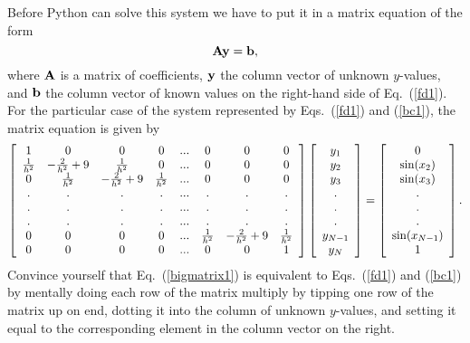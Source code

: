 Before Python can solve this system we have to put it in a matrix
equation of the form 
\begin{equation}
    {\bf A y} = {\bf b},
\end{equation}
where ${\bf A}$ is a matrix of coefficients, ${\bf y}$ the column
vector of unknown $y$-values, and ${\bf b}$ the column vector of
known values on the right-hand side of Eq.~(\ref{fd1}).  For the
particular case of the system represented by Eqs.~(\ref{fd1}) and
(\ref{bc1}), the matrix equation is given by \small
\begin{equation}\label{bigmatrix1}
\left[
\begin{array}{cccccccc}
1 & 0 & 0 & 0 & ... & 0 & 0 & 0 \\
{1 \over h^2} & -{2 \over h^2} + 9 & {1 \over h^2} & 0 & ... & 0 & 0 & 0 \\
0 & {1 \over h^2} & -{2 \over h^2} + 9 & {1 \over h^2} & ... & 0 & 0 & 0 \\
. & . & . & . & ... & . & . & . \\
. & . & . & . & ... & . & . & . \\
. & . & . & . & ... & . & . & . \\
0 & 0 & 0 & 0 & ... & {1 \over h^2} & -{2 \over h^2} + 9 & {1 \over h^2} \\
0 & 0 & 0 & 0 & ... & 0 & 0 & 1 \\
\end{array}
\right]
\left[
\begin{array}{c}
y_1 \\
y_2 \\
y_3  \\
.   \\
.   \\
.   \\
y_{N-1}  \\
y_N
\end{array}
\right]
=
\left[
\begin{array}{c}
0   \\
\sin (x_2) \\
\sin ( x_3) \\
.  \\
.  \\
.  \\
\sin( x_{N-1} )\\
1
\end{array}
\right] .
\end{equation} \normalsize
Convince yourself that Eq.~(\ref{bigmatrix1}) is equivalent to
Eqs.~(\ref{fd1}) and (\ref{bc1}) by mentally doing each row of the
matrix multiply by tipping one row of the matrix up on end, dotting
it into the column of unknown $y$-values, and setting it equal to the
corresponding element in the column vector on the right.

